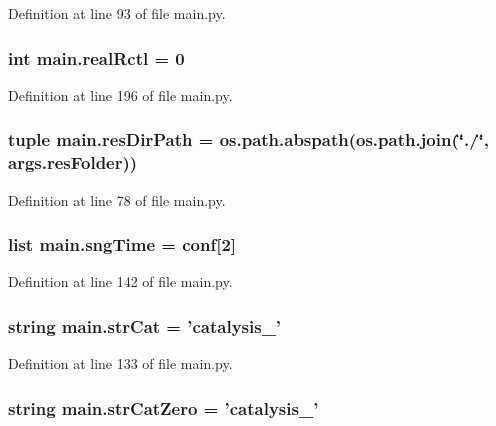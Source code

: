 Definition at line 93 of file main.\+py.

\hypertarget{a00153_a2dcb93d1b24fce96491e031528ed43c0}{
\subsubsection[{real\+Rctl}]{\setlength{\rightskip}{0pt plus 5cm}int main.\+real\+Rctl = 0}}\label{a00153_a2dcb93d1b24fce96491e031528ed43c0}


Definition at line 196 of file main.\+py.

\hypertarget{a00153_a93d7d68ada532b3cedaab103283ab91a}{
\subsubsection[{res\+Dir\+Path}]{\setlength{\rightskip}{0pt plus 5cm}tuple main.\+res\+Dir\+Path = os.\+path.\+abspath(os.\+path.\+join(\char`\"{}./\char`\"{}, args.\+res\+Folder))}}\label{a00153_a93d7d68ada532b3cedaab103283ab91a}


Definition at line 78 of file main.\+py.

\hypertarget{a00153_ab4296f1ae2e4c4bb597ca27e84849510}{
\subsubsection[{sng\+Time}]{\setlength{\rightskip}{0pt plus 5cm}list main.\+sng\+Time = {\bf conf}\mbox{[}2\mbox{]}}}\label{a00153_ab4296f1ae2e4c4bb597ca27e84849510}


Definition at line 142 of file main.\+py.

\hypertarget{a00153_ab12df661b7defb4d7077777ad7d6352d}{
\subsubsection[{str\+Cat}]{\setlength{\rightskip}{0pt plus 5cm}string main.\+str\+Cat = 'catalysis\+\_\+'}}\label{a00153_ab12df661b7defb4d7077777ad7d6352d}


Definition at line 133 of file main.\+py.

\hypertarget{a00153_a6bb1e2c0e0d0a9e63313c082ee4eec76}{
\subsubsection[{str\+Cat\+Zero}]{\setlength{\rightskip}{0pt plus 5cm}string main.\+str\+Cat\+Zero = 'catalysis\+\_\+'}}\label{a00153_a6bb1e2c0e0d0a9e63313c082ee4eec76}


